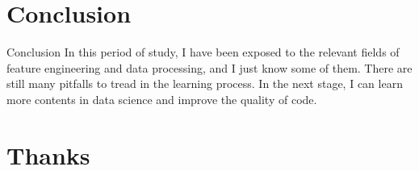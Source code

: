\documentclass[
 size=12pt,
 paper=smartboard, %
 mode=present, %
 display=slides, %
style=tuliplab,
pauseslide,
fleqn,leqno]{powerdot}
\begin{document}

\section{Conclusion}

\begin{slide}[toc=,bm=]{Conclusion}
 In this period of study, I have been exposed to the relevant fields of feature engineering and data processing, and I just know some of them. There are still many pitfalls to tread in the learning process. In the next stage, I can learn more contents in data science and improve the quality of code.

\end{slide}
\section{Thanks}


\end{document}
